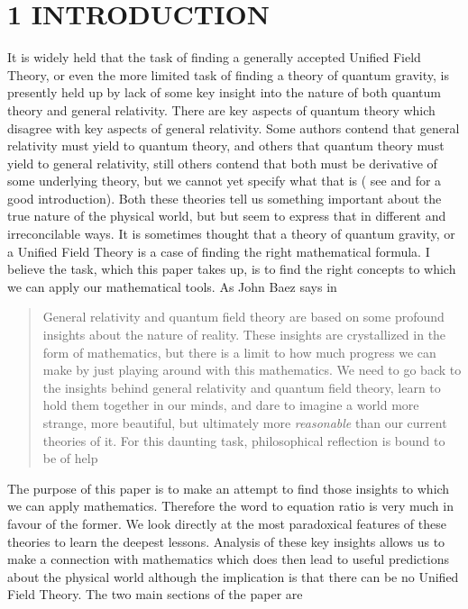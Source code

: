 \documentclass[
   ,final            %
  ]
  {aipproc}
\begin{document}
\section{1 INTRODUCTION }
\par
It is widely held that the task of finding a generally accepted Unified Field Theory, or even the more
limited task of finding a theory of quantum gravity, is presently held up by lack of some key insight into
the nature of both quantum theory and general relativity. There are key aspects of quantum theory which
disagree with key aspects of general relativity. Some authors contend that general relativity must yield to
quantum theory, and others that quantum theory must yield to general relativity, still others contend that
both must be derivative of some underlying theory, but we cannot yet specify what that is ( see \citet*{phys_meets_philosophy} and \citet{Isham_92} %
for a good introduction). Both
these theories tell us something important about the true nature of the physical world, but but seem to
express that in different and irreconcilable ways. It is sometimes thought that a theory of quantum gravity, or a Unified Field Theory
is a case of finding the right mathematical formula. I believe the task, which this paper takes up, is
to find the right concepts to which we can apply our mathematical tools. As John Baez says in \citep[chap.~8]{phys_meets_philosophy}
\begin{quotation}General relativity and quantum field theory are based on some profound insights about the
nature of reality. These insights are crystallized in the form of mathematics, but there is a limit
to how much progress we can make by just playing around with this mathematics. We need to
go back to the insights behind general relativity and quantum field theory, learn to hold them
together in our minds, and dare to imagine a world more strange, more beautiful, but ultimately
more \emph{reasonable} than our current theories of it. For this daunting task, philosophical reflection is
bound to be of help
\end{quotation}
\par
The purpose of this paper is to make an attempt to find those insights to which we can apply mathematics. 
Therefore the word to equation ratio is very much in favour of the former. We look directly at the most paradoxical features of these theories to %
learn the deepest lessons. Analysis of these key insights allows us to make a connection with mathematics which does then lead to useful
predictions about the physical world although the implication is that there can be no Unified Field Theory.  The two main sections of the paper are %
\end{document}
